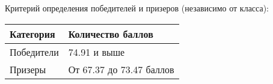 Критерий определения победителей и призеров (независимо от класса):

\begin{center}
    \begin{tabular}{|l|l|}
        \hline
        Категория&Количество баллов\\
        \hline
        Победители&74.91 и выше\\
        \hline
        Призеры&От 67.37 до 73.47 баллов\\
        \hline
    \end{tabular}
\end{center}